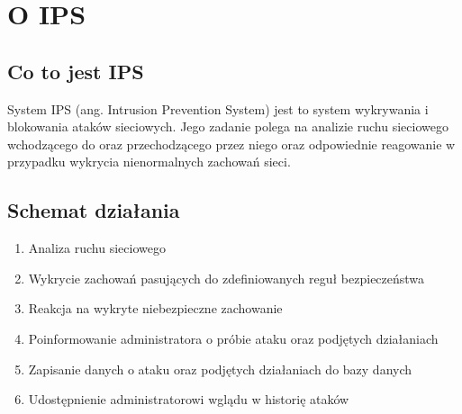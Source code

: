 \chapter{O IPS}
	\section{Co to jest IPS}
	System IPS (ang. Intrusion Prevention System) jest to system wykrywania i blokowania ataków sieciowych.
	Jego zadanie polega na analizie ruchu sieciowego wchodzącego do oraz przechodzącego przez niego oraz odpowiednie reagowanie w przypadku wykrycia nienormalnych zachowań sieci.
	\section{Schemat działania}
		\begin{enumerate}
			\item Analiza ruchu sieciowego
			\item Wykrycie zachowań pasujących do zdefiniowanych reguł bezpieczeństwa
			\item Reakcja na wykryte niebezpieczne zachowanie
			\item Poinformowanie administratora o próbie ataku oraz podjętych działaniach
			\item Zapisanie danych o ataku oraz podjętych działaniach do bazy danych
			\item Udostępnienie administratorowi wglądu w historię ataków
		\end{enumerate}
